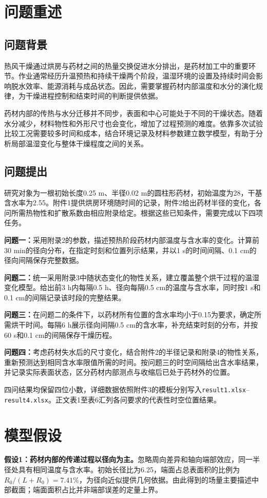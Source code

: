\section{问题重述}
\subsection{问题背景}
热风干燥通过烘房与药材之间的热量交换促进水分排出，是药材加工中的重要环节。作业通常经历升温预热和持续干燥两个阶段，温湿环境的设置及持续时间会影响脱水效率、能源消耗与成品状态。因此，需要掌握药材内部温度和水分的演化规律，为干燥进程控制和结束时间的判断提供依据。

药材内部的传热与水分迁移并不同步，表面和中心可能处于不同的干燥状态。随着水分减少，材料物性和外形尺寸也会变化，增加了过程预测的难度。依靠多次试验比较工况需要较多时间和成本，结合环境记录及材料参数建立数学模型，有助于分析局部温湿变化与整体干燥程度之间的关系。

\subsection{问题提出}
研究对象为一根初始长度0.25 m、半径0.02 m的圆柱形药材，初始温度为28\tempunit，干基含水率为2.55\cunit。附件1提供烘房环境随时间的记录，附件2给出药材半径的变化，各问所需热物性和扩散系数由相应附录给定\cite{problem}。根据这些已知条件，需要完成以下四项任务。

\textbf{问题一：}采用附录2的参数，描述预热阶段药材内部温度与含水率的变化。计算前30 min的径向分布，在指定时刻和位置列示结果，并以1 s的时间间隔、0.1 cm的径向间隔保存完整数据。

\textbf{问题二：}统一采用附录3中随状态变化的物性关系，建立覆盖整个烘干过程的温湿变化模型。给出前3 h内每隔0.5 h、径向每隔0.5 cm的温度与含水率，同时按1 s和0.1 cm的间隔记录该时段的完整结果。

\textbf{问题三：}在问题二的条件下，以药材所有位置的含水率均小于0.15\cunit 为要求，确定所需烘干时间。每隔6 h展示径向间隔0.5 cm的含水率，补充结束时刻的分布，并按60 s和0.1 cm的间隔保存干燥历程。

\textbf{问题四：}考虑药材失水后的尺寸变化，结合附件2的半径记录和附录4的物性关系，重新预测达到相同含水率限值所需的时间。按问题三的时空间隔给出含水率结果，并记录实际表面状态，区分药材内部测点与收缩后已处于药材外的位置。

四问结果均保留四位小数，详细数据依照附件3的模板分别写入\texttt{result1.xlsx}--\texttt{result4.xlsx}。正文表1至表6汇列各问要求的代表性时空位置结果。

\section{模型假设}
\textbf{假设1：药材内部的传递过程以径向为主。}忽略周向差异和轴向端部效应，同一半径处具有相同温度与含水率。初始长径比为6.25，端面占总表面积的比例为$R_0/(L+R_0)=7.41\%$，为径向近似提供几何依据。由此得到的场量主要描述中部截面；端面面积占比并非端部误差的定量上界。

